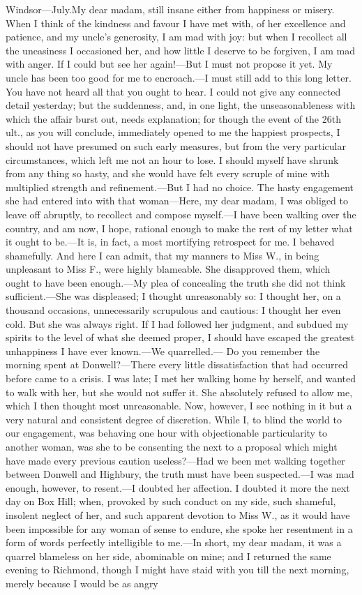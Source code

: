 \begin{mail}{Windsor—July.}{My dear madam,}
still insane either from happiness or misery. When I think of the kindness and favour I have met with, of her excellence and patience, and my uncle's generosity, I am mad with joy: but when I recollect all the uneasiness I occasioned her, and how little I deserve to be forgiven, I am mad with anger. If I could but see her again!—But I must not propose it yet. My uncle has been too good for me to encroach.—I must still add to this long letter. You have not heard all that you ought to hear. I could not give any connected detail yesterday; but the suddenness, and, in one light, the unseasonableness with which the affair burst out, needs explanation; for though the event of the 26th ult., as you will conclude, immediately opened to me the happiest prospects, I should not have presumed on such early measures, but from the very particular circumstances, which left me not an hour to lose. I should myself have shrunk from any thing so hasty, and she would have felt every scruple of mine with multiplied strength and refinement.—But I had no choice. The hasty engagement she had entered into with that woman—Here, my dear madam, I was obliged to leave off abruptly, to recollect and compose myself.—I have been walking over the country, and am now, I hope, rational enough to make the rest of my letter what it ought to be.—It is, in fact, a most mortifying retrospect for me. I behaved shamefully. And here I can admit, that my manners to Miss W., in being unpleasant to Miss F., were highly blameable. She disapproved them, which ought to have been enough.—My plea of concealing the truth she did not think sufficient.—She was displeased; I thought unreasonably so: I thought her, on a thousand occasions, unnecessarily scrupulous and cautious: I thought her even cold. But she was always right. If I had followed her judgment, and subdued my spirits to the level of what she deemed proper, I should have escaped the greatest unhappiness I have ever known.—We quarrelled.— Do you remember the morning spent at Donwell?—There every little dissatisfaction that had occurred before came to a crisis. I was late; I met her walking home by herself, and wanted to walk with her, but she would not suffer it. She absolutely refused to allow me, which I then thought most unreasonable. Now, however, I see nothing in it but a very natural and consistent degree of discretion. While I, to blind the world to our engagement, was behaving one hour with objectionable particularity to another woman, was she to be consenting the next to a proposal which might have made every previous caution useless?—Had we been met walking together between Donwell and Highbury, the truth must have been suspected.—I was mad enough, however, to resent.—I doubted her affection. I doubted it more the next day on Box Hill; when, provoked by such conduct on my side, such shameful, insolent neglect of her, and such apparent devotion to Miss W., as it would have been impossible for any woman of sense to endure, she spoke her resentment in a form of words perfectly intelligible to me.—In short, my dear madam, it was a quarrel blameless on her side, abominable on mine; and I returned the same evening to Richmond, though I might have staid with you till the next morning, merely because I would be as angry 
\end{mail}
